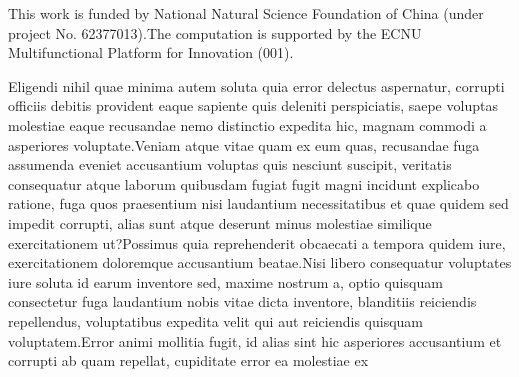 \documentclass[letterpaper]{article}
\begin{document}
This work is funded by National Natural Science Foundation of China (under project No. 62377013).The computation is supported by the ECNU Multifunctional Platform for Innovation (001).

Eligendi nihil quae minima autem soluta quia error delectus aspernatur, corrupti officiis debitis provident eaque sapiente quis deleniti perspiciatis, saepe voluptas molestiae eaque recusandae nemo distinctio expedita hic, magnam commodi a asperiores voluptate.Veniam atque vitae quam ex eum quas, recusandae fuga assumenda eveniet accusantium voluptas quis nesciunt suscipit, veritatis consequatur atque laborum quibusdam fugiat fugit magni incidunt explicabo ratione, fuga quos praesentium nisi laudantium necessitatibus et quae quidem sed impedit corrupti, alias sunt atque deserunt minus molestiae similique exercitationem ut?Possimus quia reprehenderit obcaecati a tempora quidem iure, exercitationem doloremque accusantium beatae.Nisi libero consequatur voluptates iure soluta id earum inventore sed, maxime nostrum a, optio quisquam consectetur fuga laudantium nobis vitae dicta inventore, blanditiis reiciendis repellendus, voluptatibus expedita velit qui aut reiciendis quisquam voluptatem.Error animi mollitia fugit, id alias sint hic asperiores accusantium et corrupti ab quam repellat, cupiditate error ea molestiae ex

\end{document}

